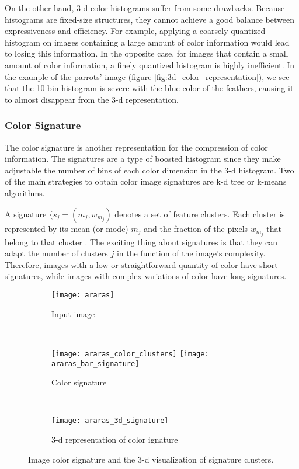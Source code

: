 On the other hand, 3-d color histograms suffer from some drawbacks. Because histograms are fixed-size structures, they cannot achieve a good balance between expressiveness and efficiency. For example, applying a coarsely quantized histogram on images containing a large amount of color information would lead to losing this information. In the opposite case, for images that contain a small amount of color information, a finely quantized histogram is highly inefficient. In the example of the parrots' image (figure \ref{fig:3d_color_representation}), we see that the 10-bin histogram is severe with the blue color of the feathers, causing it to almost disappear from the 3-d representation.

\subsubsection{Color Signature}

The color signature is another representation for the compression of color information. The signatures are a type of boosted histogram since they make adjustable the number of bins of each color dimension in the 3-d histogram. Two of the main strategies to obtain color image signatures are k-d tree or k-means algorithms.

A signature $\{s_j = (m_j, w_{m_j})$ denotes a set of feature clusters. Each cluster is represented by its mean (or mode) $m_j$ and the fraction of the pixels $w_{m_j}$ that belong to that cluster \citep{Rubner.Tomasi:Book:2001}. The exciting thing about signatures is that they can adapt the number of clusters $j$ in the function of the image's complexity. Therefore, images with a low or straightforward quantity of color have short signatures, while images with complex variations of color have long signatures.

\begin{figure}[!ht]
    \centering
    \begin{subfigure}[b]{0.25\textwidth}
        \texttt{[image: araras]}
        \caption{Input image}
    \end{subfigure} \\
    
    \begin{subfigure}[b]{0.4\textwidth}
    	\texttt{[image: araras\_color\_clusters]}
        \texttt{[image: araras\_bar\_signature]}
        \caption{Color signature}
    \end{subfigure}
    	~ %
    \begin{subfigure}[b]{0.5\textwidth}
        \texttt{[image: araras\_3d\_signature]}
        \caption{3-d representation of color ignature}
    \end{subfigure} 
    	    
    \caption{Image color signature and the 3-d visualization of signature clusters.}\label{fig:color_signature}    
\end{figure}

